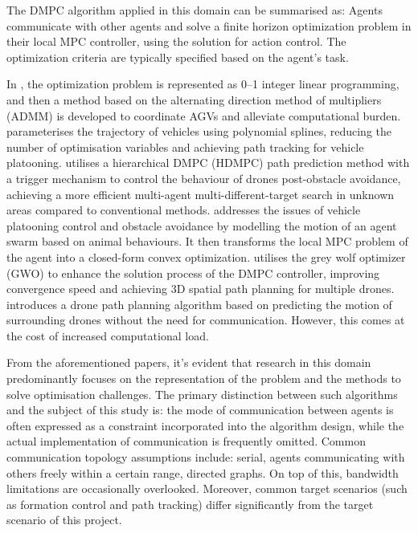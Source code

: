 The DMPC algorithm applied in this domain can be summarised as: 
Agents communicate with other agents and solve a finite horizon optimization problem in their local MPC controller, using the solution for action control. 
The optimization criteria are typically specified based on the agent's task. 

In \cite{xin2023model}, the optimization problem is represented as 0–1 integer linear programming, and then a method based on the alternating direction method of multipliers (ADMM) is developed to coordinate AGVs and alleviate computational burden.
\cite{matouvs2022distributed} parameterises the trajectory of vehicles using polynomial splines, reducing the number of optimisation variables and achieving path tracking for vehicle platooning.
\cite{zhao2022distributed} utilises a hierarchical DMPC (HDMPC) path prediction method with a trigger mechanism to control the behaviour of drones post-obstacle avoidance, achieving a more efficient multi-agent multi-different-target search in unknown areas compared to conventional methods.
\cite{mousavi2020distributed}addresses the issues of vehicle platooning control and obstacle avoidance by modelling the motion of an agent swarm based on animal behaviours. It then transforms the local MPC problem of the agent into a closed-form convex optimization.
\cite{yang2022cooperative} utilises the grey wolf optimizer (GWO) to enhance the solution process of the DMPC controller, improving convergence speed and achieving 3D spatial path planning for multiple drones.
\cite{niu2022communication} introduces a drone path planning algorithm based on predicting the motion of surrounding drones without the need for communication. However, this comes at the cost of increased computational load.

From the aforementioned papers, it's evident that research in this domain predominantly focuses on the representation of the problem and the methods to solve optimisation challenges. 
The primary distinction between such algorithms and the subject of this study is:
the mode of communication between agents is often expressed as a constraint incorporated into the algorithm design\cite{novoth2020distributed}, while the actual implementation of communication is frequently omitted.
Common communication topology assumptions include: serial\cite{xin2023model}, agents communicating with others freely within a certain range\cite{mousavi2020distributed,yang2022cooperative,zheng2023distributed,zhao2022distributed}, directed graphs\cite{tang2022distributed,zang2022optimal}. On top of this, bandwidth limitations are occasionally overlooked\cite{zheng2023distributed}.
Moreover, common target scenarios (such as formation control and path tracking) differ significantly from the target scenario of this project.



